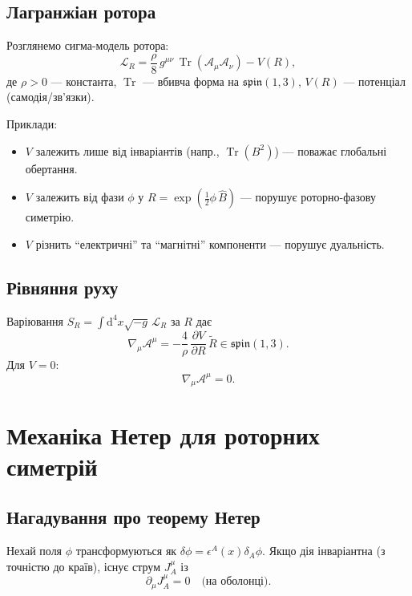 \documentclass[11pt,a4paper]{article}
\numberwithin{equation}{section}
\theoremstyle{plain}
\theoremstyle{definition}
\theoremstyle{remark}
\DeclareMathOperator{\Tr}{Tr}
\newcommand{\dd}{\mathrm{d}}
\begin{document}
\subsection{Лагранжіан ротора}

Розглянемо сигма-модель ротора:
\begin{equation}
\mathcal{L}_R = \frac{\rho}{8}\, g^{\mu\nu}\,\Tr(\mathcal{A}_\mu\mathcal{A}_\nu) - V(R),
\label{eq:Lrot}
\end{equation}
де $\rho>0$ — константа, $\Tr$ — вбивча форма на $\mathfrak{spin}(1,3)$, $V(R)$ — потенціал (самодія/зв’язки).

Приклади:
\begin{itemize}
  \item $V$ залежить лише від інваріантів (напр., $\Tr(B^2)$) — поважає глобальні обертання.
  \item $V$ залежить від фази $\phi$ у $R=\exp(\frac{1}{2}\phi\,\hat{B})$ — порушує роторно-фазову симетрію.
  \item $V$ різнить “електричні” та “магнітні” компоненти — порушує дуальність.
\end{itemize}

\subsection{Рівняння руху}

Варіювання $S_R=\int \dd^4x \sqrt{-g}\,\mathcal{L}_R$ за $R$ дає
\begin{equation}
\nabla_\mu \mathcal{A}^\mu = -\frac{4}{\rho}\,\frac{\partial V}{\partial R}\,\widetilde{R} \in \mathfrak{spin}(1,3).
\label{eq:eom}
\end{equation}
Для $V=0$:
\begin{equation}
\nabla_\mu \mathcal{A}^\mu = 0.
\end{equation}

\section{Механіка Нетер для роторних симетрій}
\label{sec:noether}

\subsection{Нагадування про теорему Нетер}

Нехай поля $\phi$ трансформуються як $\delta\phi=\epsilon^A(x)\delta_A\phi$. Якщо дія інваріантна (з точністю до країв), існує струм $J^\mu_A$ із
\begin{equation}
\partial_\mu J^\mu_A = 0 \quad \text{(на оболонці)}.
\end{equation}
\end{document}
